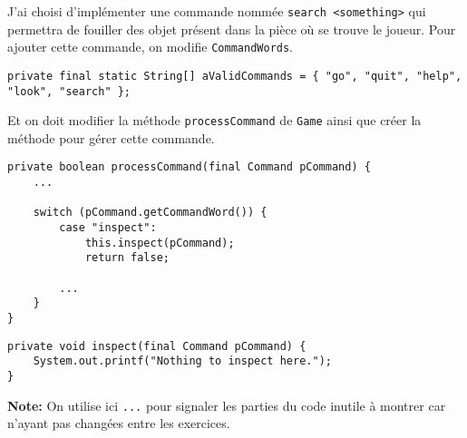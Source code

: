 \begin{exercise}[subtitle=Commande search]
 
 J'ai choisi d'implémenter une commande nommée \verb|search <something>| qui permettra de fouiller des objet présent dans la pièce où se trouve le joueur. Pour ajouter cette commande, on modifie \verb|CommandWords|.
 
\begin{verbatim}
private final static String[] aValidCommands = { "go", "quit", "help", "look", "search" };
\end{verbatim}

Et on doit modifier la méthode \verb|processCommand| de \verb|Game| ainsi que créer la méthode pour gérer cette commande.

\begin{verbatim}
private boolean processCommand(final Command pCommand) {
    ...

    switch (pCommand.getCommandWord()) {
        case "inspect":
            this.inspect(pCommand);
            return false;

        ...
    }
}
\end{verbatim}

\begin{verbatim}
private void inspect(final Command pCommand) {
    System.out.printf("Nothing to inspect here.");
}
\end{verbatim}

\textbf{Note:} On utilise ici \verb|...| pour signaler les parties du code inutile à montrer car n'ayant pas changées entre les exercices.

\end{exercise}


